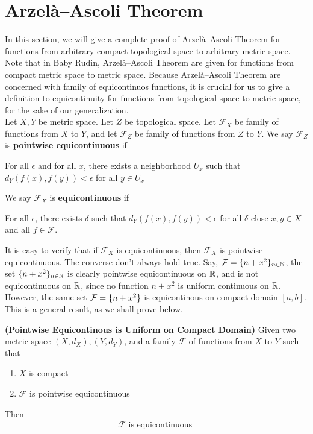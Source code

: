 \documentclass{report}
\begin{document}
\section{Arzelà–Ascoli Theorem}
\begin{mdframed}
In this section, we will give a complete proof of Arzelà–Ascoli Theorem for functions from arbitrary compact topological space to arbitrary metric space. Note that in Baby Rudin, Arzelà–Ascoli Theorem are given for functions from compact metric space to metric space. Because Arzelà–Ascoli Theorem are concerned with family of equicontinuos functions, it is crucial for us to give a definition to equicontinuity for functions from topological  space to metric space, for the sake of our generalization.\\

Let $X,Y$ be metric space. Let  $Z$ be topological space. Let  $\mathcal{F}_X$ be family of functions from $X$ to  $Y$, and let  $\mathcal{F}_Z$ be family of functions from $Z$ to  $Y$. We say  $\mathcal{F}_Z$ is \textbf{pointwise equicontinuous} if 
\begin{center}
   \begin{minipage}{0.9\linewidth}  
       \centering
       For all $\epsilon $ and for all $x$, there exists a neighborhood $U_x$ such that  $d_Y(f(x),f(y))<\epsilon $ for all $y \in U_x$   
   \end{minipage}
\end{center}
We say $\mathcal{F}_X$ is \textbf{equicontinuous} if 
\begin{center}
   \begin{minipage}{0.9\linewidth}  
       \centering
       For all $\epsilon $, there exists $\delta$ such that  $d_{Y}(f(x),f(y))<\epsilon $ for all $\delta$-close $x,y \in X$ and all  $f \in \mathcal{F}$. 
   \end{minipage}
\end{center}
It is easy to verify that if $\mathcal{F}_X$ is equicontinuous, then $\mathcal{F}_X$ is pointwise equicontinuous. The converse don't always hold true. Say, $\mathcal{F}=\{ n+x^2 \}_{n\in\mathbb{N}}$, the set $\{ n+x^2 \}_{n\in\mathbb{N}}$ is clearly pointwise equicontinuous on $\mathbb{R}$, and is not equicontinuous on $\mathbb{R}$, since no function $n+x^2$  is uniform continuous on $\mathbb{R}$. However, the same set $\mathcal{F}=\{ n+x^2 \}$ is equicontinous on compact domain $[a,b]$. This is a general result, as we shall prove below.
\end{mdframed}
\begin{theorem}
\textbf{(Pointwise Equicontinous is Uniform on Compact Domain)} Given two metric space $(X,d_X),(Y,d_Y)$, and a family $\mathcal{F}$ of functions from $X$ to  $Y$ such that 
 \begin{enumerate}[label=(\alph*)]
  \item $X$ is compact 
   \item $\mathcal{F}$ is pointwise equicontinuous
\end{enumerate}
Then 
\begin{align*}
\mathcal{F}\text{ is equicontinuous }
\end{align*}
\end{theorem}
\end{document}
